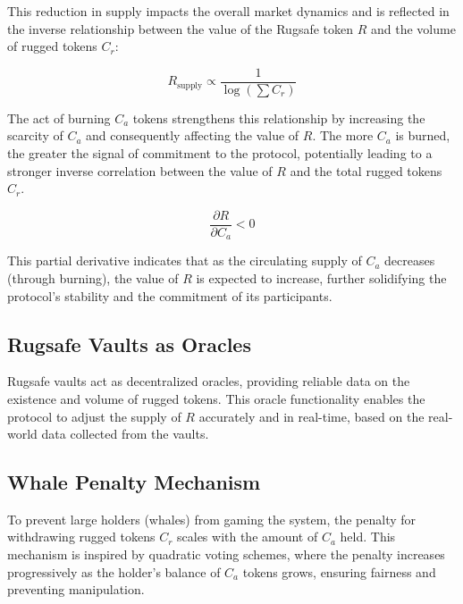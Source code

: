 \documentclass{article}
\begin{document}
This reduction in supply impacts the overall market dynamics and is reflected in the inverse relationship between the value of the Rugsafe token $R$ and the volume of rugged tokens $C_r$:

\[
R_\text{supply}  \propto \frac{1}{\log\left(\sum C_r \right)}
\]

The act of burning $C_a$ tokens strengthens this relationship by increasing the scarcity of $C_a$ and consequently affecting the value of $R$. The more $C_a$ is burned, the greater the signal of commitment to the protocol, potentially leading to a stronger inverse correlation between the value of $R$ and the total rugged tokens $C_r$.

\[
\frac{\partial R}{\partial C_a} < 0
\]

This partial derivative indicates that as the circulating supply of $C_a$ decreases (through burning), the value of $R$ is expected to increase, further solidifying the protocol's stability and the commitment of its participants.










\subsection{Rugsafe Vaults as Oracles}
Rugsafe vaults act as decentralized oracles, providing reliable data on the existence and volume of rugged tokens. This oracle functionality enables the protocol to adjust the supply of $R$ accurately and in real-time, based on the real-world data collected from the vaults.



























\subsection{Whale Penalty Mechanism}
To prevent large holders (whales) from gaming the system, the penalty for withdrawing rugged tokens $C_r$ scales with the amount of $C_a$ held. This mechanism is inspired by quadratic voting schemes, where the penalty increases progressively as the holder's balance of $C_a$ tokens grows, ensuring fairness and preventing manipulation.
\end{document}
